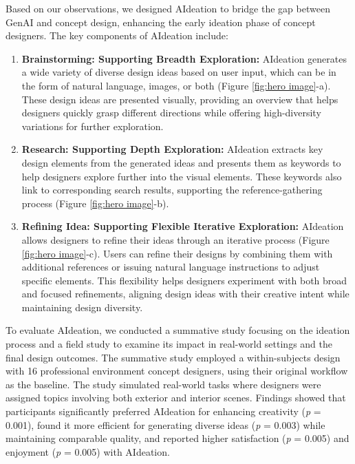 Based on our observations, we designed AIdeation to bridge the gap between GenAI and concept design, enhancing the early ideation phase of concept designers. The key components of AIdeation include: 
\begin{enumerate}
    \item \textbf{Brainstorming: Supporting Breadth Exploration:} AIdeation generates a wide variety of diverse design ideas based on user input, which can be in the form of natural language, images, or both (Figure \ref{fig:hero image}-a). These design ideas are presented visually, providing an overview that helps designers quickly grasp different directions while offering high-diversity variations for further exploration. 
    \item \textbf{Research: Supporting Depth Exploration:} AIdeation extracts key design elements from the generated ideas and presents them as keywords to help designers explore further into the visual elements. These keywords also link to corresponding search results, supporting the reference-gathering process (Figure \ref{fig:hero image}-b).
    \item \textbf{Refining Idea: Supporting Flexible Iterative Exploration:} AIdeation allows designers to refine their ideas through an iterative process (Figure \ref{fig:hero image}-c). Users can refine their designs by combining them with additional references or issuing natural language instructions to adjust specific elements. This flexibility helps designers experiment with both broad and focused refinements, aligning design ideas with their creative intent while maintaining design diversity.
\end{enumerate}

To evaluate AIdeation, we conducted a summative study focusing on the ideation process and a field study to examine its impact in real-world settings and the final design outcomes. The summative study employed a within-subjects design with 16 professional environment concept designers, using their original workflow as the baseline. The study simulated real-world tasks where designers were assigned topics involving both exterior and interior scenes. Findings showed that participants significantly preferred AIdeation for enhancing creativity (\textit{p} = 0.001), found it more efficient for generating diverse ideas (\textit{p} = 0.003) while maintaining comparable quality, and reported higher satisfaction (\textit{p} = 0.005) and enjoyment (\textit{p} = 0.005) with AIdeation.


